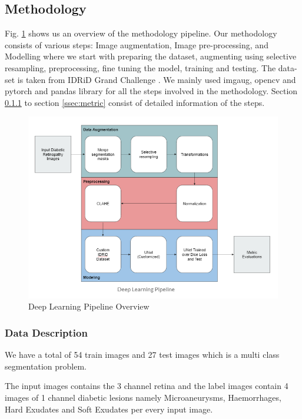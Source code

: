\documentclass[conference]{IEEEtran}
\begin{document}
\subsection{Methodology}                                                                     
Fig. \ref{fig:dl} shows us an overview of the methodology pipeline. Our methodology consists of various steps: Image augmentation, Image pre-processing, and Modelling where we start with preparing the dataset, augmenting using selective resampling, preprocessing, fine tuning the model, training and testing. The data-set is taken from IDRiD Grand Challenge \cite{idrid}. We mainly  used imgaug, opencv and pytorch\cite{7} and pandas library for all the steps involved in the methodology. Section \ref{sssec:describe} to section \ref{ssec:metric} consist of detailed information of the steps.    
\par              
\begin{figure}[t]
	\centering
	\includegraphics[scale=0.7]{image/dl_pipeline.PNG}
	\caption{Deep Learning Pipeline Overview}
	\label{fig:dl}
\end{figure}

\subsubsection{Data Description}
\label{sssec:describe}
We have a total of 54 train images and 27 test images which is a multi class segmentation problem. 
\par
The input images contains the 3 channel retina and the label images contain 4 images of 1 channel diabetic lesions namely Microaneurysms, Haemorrhages, Hard Exudates and Soft Exudates per every input image.
\end{document}

